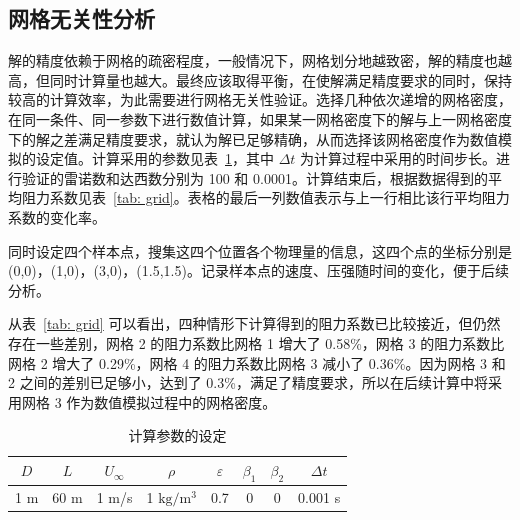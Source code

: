 \subsection{网格无关性分析}\label{subsec: grid-independent}

解的精度依赖于网格的疏密程度，一般情况下，网格划分地越致密，解的精度也越高，但同时计算量也越大。最终应该取得平衡，在使解满足精度要求的同时，保持较高的计算效率，为此需要进行网格无关性验证。选择几种依次递增的网格密度，在同一条件、同一参数下进行数值计算，如果某一网格密度下的解与上一网格密度下的解之差满足精度要求，就认为解已足够精确，从而选择该网格密度作为数值模拟的设定值。计算采用的参数见表~\ref{tab: parameters}，其中 $\Delta t$ 为计算过程中采用的时间步长。进行验证的雷诺数和达西数分别为 100 和 0.0001。计算结束后，根据数据得到的平均阻力系数见表~\ref{tab: grid}。表格的最后一列数值表示与上一行相比该行平均阻力系数的变化率。

同时设定四个样本点，搜集这四个位置各个物理量的信息，这四个点的坐标分别是 (0,0)，(1,0)，(3,0)，(1.5,1.5)。记录样本点的速度、压强随时间的变化，便于后续分析。

从表~\ref{tab: grid} 可以看出，四种情形下计算得到的阻力系数已比较接近，但仍然存在一些差别，网格 2 的阻力系数比网格 1 增大了 0.58\%，网格 3 的阻力系数比网格 2 增大了 0.29\%，网格 4 的阻力系数比网格 3 减小了 0.36\%。因为网格 3 和 2 之间的差别已足够小，达到了 0.3\%，满足了精度要求，所以在后续计算中将采用网格 3 作为数值模拟过程中的网格密度。

\begin{table}[ht]
	\caption{计算参数的设定}\label{tab: parameters}
	\vspace{.5em}\centering\wuhao
	\begin{tabular}{*{8}{c}}
		\toprule[1.5pt]
		$D$ & $L$ & $U_{\infty}$ & $\rho$ & $\varepsilon$ & $\beta_1$ & $\beta_2$ & $\Delta t$\\
		\midrule[1pt]
		1 m & 60 m & 1 m/s & 1 $\mathrm{kg}/\mathrm{m}^3$ & 0.7 & 0 & 0 & 0.001 s\\
		\bottomrule[1.5pt]
	\end{tabular}
\end{table}

